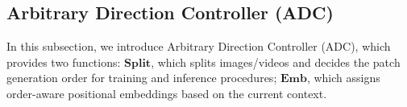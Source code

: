 \documentclass{article}
\begin{document}








\subsection{Arbitrary Direction Controller (ADC)}\label{sec:adc}


In this subsection, we introduce Arbitrary Direction Controller (ADC), which provides two functions: $\textbf{Split}$, which splits images/videos and decides the patch generation order for training and inference procedures; $\textbf{Emb}$, which assigns order-aware positional embeddings based on the current context.
\end{document}
